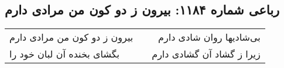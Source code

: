 \begin{center}
\section*{رباعی شماره ۱۱۸۴: بیرون ز دو کون من مرادی دارم}
\label{sec:1184}
\begin{longtable}{l p{0.5cm} r}
بیرون ز دو کون من مرادی دارم
&&
بی‌شادیها روان شادی دارم
\\
بگشای بخنده آن لبان خود را
&&
زیرا ز گشاد آن گشادی دارم
\\
\end{longtable}
\end{center}

